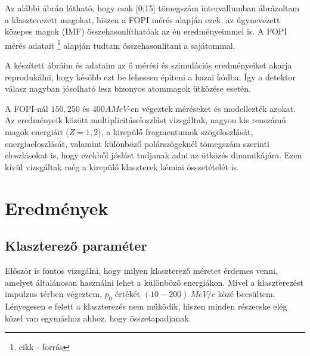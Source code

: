 \documentclass[a4paper,12pt]{article}
\begin{document}
\par Az alábbi ábrán látható, hogy csak [0;15] tömegszám intervallumban ábrázoltam a klaszterezett magokat, hiszen a FOPI mérés alapján ezek, az úgynevezett közepes magok (IMF) összehasonlíthatóak az én eredményeimmel is. A FOPI mérés adatait \footnote{cikk - forrás} alapján tudtam összehasonlítani a sajátommal.

\vspace{5mm}

\par A készített ábráim és adataim az ő mérési és szimulációs eredményeiket akarja reprodukálni, hogy később ezt be lehessen építeni a hazai kódba. Így a detektor válasz nagyban jósolható lesz bizonyos atommagok ütközése esetén.

\vspace{5mm}

\par A FOPI-nál $150, 250$ és $400 A MeV$-en végeztek méréseket és modellezték azokat. Az eredményeik között multiplicitáseloszlást vizsgáltak, nagyon kis renszámú magok energiáit ($ Z = 1,2$), a kirepülő fragmentumok szögeloszlását, energiaeloszlását, valamint különböző polárszögeknél tömegszám szerinti eloszlásokat is, hogy ezekből jóslást tudjanak adni az ütközés dinamikájára. Ezen kívül vizsgáltak még a kirepülő klaszterek kémiai összetételét is. 

\section{ Eredmények}

\vspace{5mm}

\subsection{Klaszterező paraméter}

\vspace{5mm}

\par Először is fontos vizsgálni, hogy milyen klaszterező méretet érdemes venni, amelyet általánosan használni lehet a különböző energiákon. Mivel a klaszterezést impulzus térben végeztem, $p_{0}$ értékét $(10 - 200) ~MeV/c$ közé becsültem. Lényegesen e felett a klaszterezés nem működik, hiszen minden részecske elég közel van egymáshoz ahhoz, hogy összetapadjanak. 

\vspace{5mm}
\end{document}
